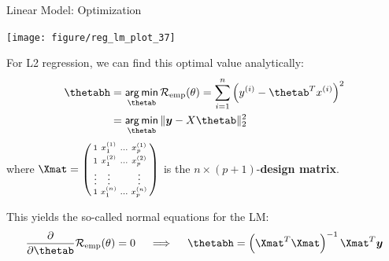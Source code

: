 \documentclass[11pt,compress,t,notes=noshow, xcolor=table]{beamer}
\newenvironment{knitrout}{}{} %
\begin{document}
\begin{vbframe}{Linear Model: Optimization}
\begin{knitrout}
{\centering \texttt{[image: figure/reg\_lm\_plot\_37]} 

}



\end{knitrout}


\framebreak

For L2 regression, we can find this optimal value analytically:
\begin{align*}
\thetabh &= \argmin_{\thetab} \risket = \sumin \left(\yi - \thetab^T \xi\right)^2\\
             &=\argmin_{\thetab} \|\yv - X\thetab\|^2_2\
\end{align*}
where $\Xmat = \left(\begin{smallmatrix}1 & x^{(1)}_1 & \ldots & x^{(1)}_p \\
                              1 & x^{(2)}_1 & \ldots & x^{(2)}_p \\
                              \vdots & \vdots & & \vdots \\
                              1 & x^{(n)}_1 & \ldots & x^{(n)}_p \end{smallmatrix}\right)$
is the $n \times (p+1)$-\textbf{design matrix}.

\lz

This yields the so-called normal equations for the LM:
\[
\frac{\partial}{\partial\thetab} \risket = 0 \quad\implies\quad \thetabh = \left(\Xmat^T \Xmat\right)^{-1}\Xmat^T\yv
\]

\end{vbframe}
\end{document}
